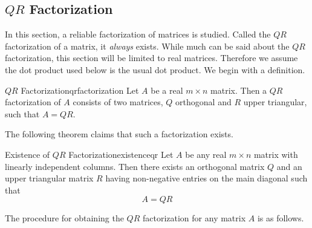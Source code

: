 \subsection{$QR$ Factorization}

In this section, a reliable factorization of matrices is studied. Called the $QR$ factorization of a matrix, it \textit{always} exists. While much can be said about the $QR$ factorization, this section will be limited to real matrices. Therefore we assume the dot product used below is the usual dot product. We begin with a definition. 

\begin{definition}{$QR$ Factorization}{qrfactorization}
Let $A$ be a real $m\times n$ matrix. Then a $QR$ factorization of $A$ consists
of two matrices, $Q$ orthogonal and $R$ upper
triangular, such that $A=QR.$  
\end{definition}

The following theorem claims that such a factorization exists. 

\begin{theorem}{Existence of $QR$ Factorization}{existenceqr}
Let $A$ be any real $m\times n$ matrix with linearly independent columns. Then there exists an orthogonal
matrix $Q$ and an upper triangular matrix $R$ having non-negative entries
on the main diagonal such that
\begin{equation*}
A=QR
\end{equation*}
\end{theorem}

The procedure for obtaining the $QR$ factorization for any matrix $A$ is as follows.

